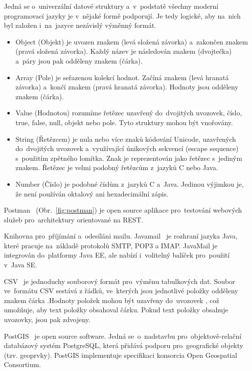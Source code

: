 Jedná se o~univerzální datové struktury a~v~podstatě všechny moderní programovací jazyky je v~nějaké formě podporují. Je tedy logické, aby na~nich byl založen i~na~jazyce nezávislý výměnný formát.
\begin{itemize}
	\item Object (Objekt) je uvozen znakem \uv{\{} (levá složená závorka) a~zakončen znakem \uv{\}} (pravá složená závorka). Každý název je následován znakem \uv{:} (dvojtečka) a~páry  jsou pak odděleny znakem \uv{,} (čárka).
	\item Array (Pole) je seřazenou kolekcí hodnot. Začíná znakem \uv{[} (levá hranatá závorka) a~končí znakem \uv{]} (pravá hranatá závorka). Hodnoty jsou odděleny znakem \uv{,} (čárka).
	\item Value (Hodnotou) rozumíme řetězec uzavřený do~dvojitých uvozovek, číslo, true, false, null, objekt nebo pole.
	Tyto struktury mohou být vnořovány.
	\item String (Řetězcem) je nula nebo více znaků kódování Unicode, uzavřených do~dvojitých uvozovek a~využívající únikových sekvencí (escape sequence) s~použitím zpětného lomítka. Znak je reprezentován jako řetězec s~jediným znakem. Řetězec je velmi podobný řetězcům z~jazyků C nebo Java.
	\item Number (Číslo) je podobné číslům z~jazyků C a~Java. Jedinou výjimkou je, že není používán oktalový ani hexadecimální zápis.
\end{itemize}

Postman~\cite{postman} (Obr.~\ref{fig:postman}) je open source aplikace pro~testování webových služeb pro~architektury orientované na REST.


Knihovna pro~příjímání a~odesíláni mailu. Javamail~\cite{javamail} je rozhraní jazyka Java, které pracuje na~základě protokolů SMTP, POP3 a IMAP. JavaMail je integrován do~platformy Java EE, ale nabízí i~volitelný balíček pro~použití v~Java SE.

CSV~\cite{csv} je jednoduchy souborový formát pro~výměnu tabulkových dat.
Soubor ve~formátu CSV sestává z řádků, ve~kterých jsou jednotlivé položky odděleny znakem čárka \uv{,}.Hodnoty položek mohou být uzavřeny do~uvozovek , což umožňuje, aby text položky obsahoval čárku. Pokud text položky obsahuje uvozovky, jsou pak zdvojeny.

PostGIS~\cite{postgis} je open source software. Jedná se~o~nadstavbu pro~objektově-relační databázový systém PostgreSQL, která přidává podporu pro~geografické objekty (tzv. geoprvky). PostGIS implementuje specifikaci  konsorcia Open Geospatial Consortium.


